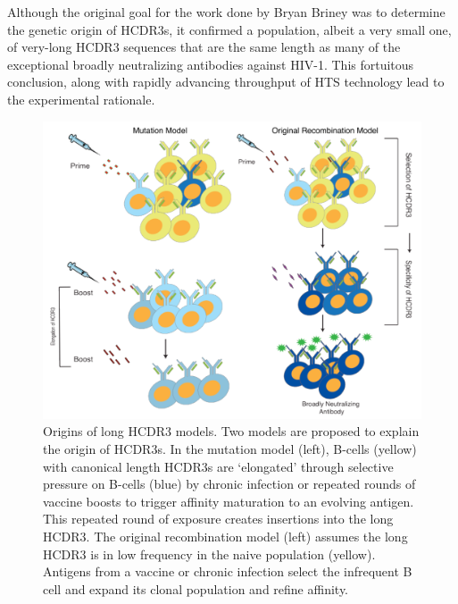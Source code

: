 Although the original goal for the work done by Bryan Briney was to determine the genetic origin of HCDR3s, it confirmed a population, albeit a very small one, of very-long HCDR3 sequences that are the same length as many of the exceptional broadly neutralizing antibodies against HIV-1. This fortuitous conclusion, along with rapidly advancing throughput of HTS technology lead to the experimental rationale.

\begin{figure}[pb]
   \centering
   \includegraphics[width=.99\textwidth]{images/chapter3/figure3_2.pdf} %
   \caption[Origins of Long HCDR3 Models]{Origins of long HCDR3 models. Two models are proposed to explain the origin of HCDR3s. In the mutation model (left), B-cells (yellow) with canonical length HCDR3s are `elongated' through selective pressure on B-cells (blue) by chronic infection or repeated rounds of vaccine boosts to trigger affinity maturation to an evolving antigen. This repeated round of exposure creates insertions into the long HCDR3. The original recombination model (left) assumes the long HCDR3 is in low frequency in the naive population (yellow). Antigens from a vaccine or chronic infection select the infrequent B cell and expand its clonal population and refine affinity.}
   \label{fig:figure3_2}
\end{figure}

